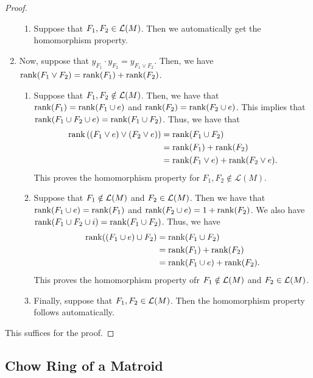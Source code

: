 \documentclass{puthesis-UG}
\begin{document}
\begin{proof}
\begin{enumerate}[label = (\alph*)]
\begin{enumerate}[label = (\roman*)]
			\item Suppose that $F_1, F_2 \in \mathcal{L}(M)$. Then we automatically get the homomorphism property. 
		\end{enumerate}

		\item Now, suppose that $y_{F_1} \cdot y_{F_2} = y_{F_1 \vee F_2}$. Then, we have $\operatorname{rank} (F_1 \vee F_2) = \operatorname{rank} (F_1) + \operatorname{rank} (F_2)$. 
		\begin{enumerate}[label = (\roman*)]
			\item Suppose that $F_1, F_2 \notin \mathcal{L}(M)$. Then, we have that $\operatorname{rank} (F_1) = \operatorname{rank}(F_1 \cup e)$ and $\operatorname{rank} (F_2) = \operatorname{rank} (F_2 \cup e)$. This implies that $\operatorname{rank} (F_1 \cup F_2 \cup e) = \operatorname{rank} (F_1 \cup F_2)$. Thus, we have that 
			\begin{align*}
				\operatorname{rank} \left((F_1 \vee e) \vee (F_2 \vee e)\right) & = \operatorname{rank} (F_1 \cup F_2) \\
				& = \operatorname{rank} (F_1) + \operatorname{rank} (F_2) \\
				& = \operatorname{rank} (F_1 \vee e) + \operatorname{rank} (F_2 \vee e). 
			\end{align*}
			This proves the homomorphism property for $F_1, F_2 \notin \mathcal{L}(M)$. 

			\item Suppose that $F_1 \notin \mathcal{L}(M)$ and $F_2 \in \mathcal{L}(M)$. Then we have that $\operatorname{rank} (F_1 \cup e) = \operatorname{rank} (F_1)$ and $\operatorname{rank} (F_2 \cup e) = 1 + \operatorname{rank} (F_2)$. We also have $\operatorname{rank} (F_1 \cup F_2 \cup i) = \operatorname{rank} (F_1 \cup F_2)$. Thus, we have 
			\begin{align*}
				\operatorname{rank}((F_1 \cup e) \cup F_2 ) & = \operatorname{rank} (F_1 \cup F_2) \\
				& = \operatorname{rank} (F_1) + \operatorname{rank} (F_2) \\
				& = \operatorname{rank} (F_1 \cup e) + \operatorname{rank} (F_2). 
			\end{align*}
			This proves the homomorphism property ofr $F_1 \notin \mathcal{L}(M)$ and $F_2 \in \mathcal{L}(M)$. 

			\item Finally, suppose that $F_1, F_2 \in \mathcal{L}(M)$. Then the homomorphism property follows automatically. 
		\end{enumerate}
	\end{enumerate} 
	This suffices for the proof. 
\end{proof}

\subsection{Chow Ring of a Matroid} \label{sec:chow-ring-matroid}
\end{document}
